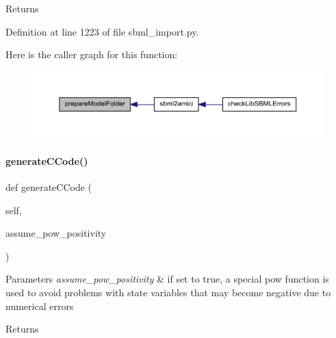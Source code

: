 \begin{DoxyReturn}{Returns}

\end{DoxyReturn}


Definition at line 1223 of file sbml\+\_\+import.\+py.

Here is the caller graph for this function\+:
\nopagebreak
\begin{figure}[H]
\begin{center}
\leavevmode
\includegraphics[width=350pt]{classamici_1_1sbml__import_1_1_sbml_importer_a39c6b169618d16df62686f18aa92db75_icgraph}
\end{center}
\end{figure}
\mbox{\label{classamici_1_1sbml__import_1_1_sbml_importer_ab36c229db61f3892cc5ae1b29d56940f}} 
\paragraph{\texorpdfstring{generate\+C\+Code()}{generateCCode()}}
{\footnotesize\ttfamily def generate\+C\+Code (\begin{DoxyParamCaption}\item[{}]{self,  }\item[{}]{assume\+\_\+pow\+\_\+positivity }\end{DoxyParamCaption})}


\begin{DoxyParams}{Parameters}
{\em assume\+\_\+pow\+\_\+positivity} & if set to true, a special pow function is used to avoid problems with state variables that may become negative due to numerical errors\\
\hline
\end{DoxyParams}
\begin{DoxyReturn}{Returns}

\end{DoxyReturn}


